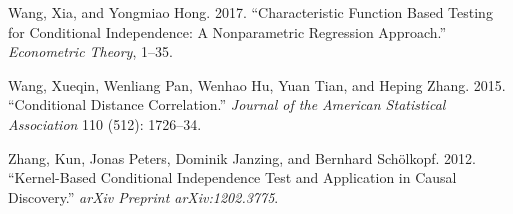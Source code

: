 \documentclass[
  12pt,
  letterpaper]{article}
\newlength{\cslhangindent}
\newenvironment{cslreferences}%
  {\setlength{\parindent}{0pt}%
  \everypar{\setlength{\hangindent}{\cslhangindent}}\ignorespaces}%
  {\par}
\theoremstyle{definition}
\theoremstyle{definition}
\theoremstyle{definition}
\theoremstyle{remark}
\begin{document}
\begin{cslreferences}
\leavevmode\hypertarget{ref-wang2017characteristic}{}%
Wang, Xia, and Yongmiao Hong. 2017. ``Characteristic Function Based Testing for Conditional Independence: A Nonparametric Regression Approach.'' \emph{Econometric Theory}, 1--35.

\leavevmode\hypertarget{ref-wang2015conditional}{}%
Wang, Xueqin, Wenliang Pan, Wenhao Hu, Yuan Tian, and Heping Zhang. 2015. ``Conditional Distance Correlation.'' \emph{Journal of the American Statistical Association} 110 (512): 1726--34.

\leavevmode\hypertarget{ref-zhang2012kernel}{}%
Zhang, Kun, Jonas Peters, Dominik Janzing, and Bernhard Schölkopf. 2012. ``Kernel-Based Conditional Independence Test and Application in Causal Discovery.'' \emph{arXiv Preprint arXiv:1202.3775}.
\end{cslreferences}
\end{document}
